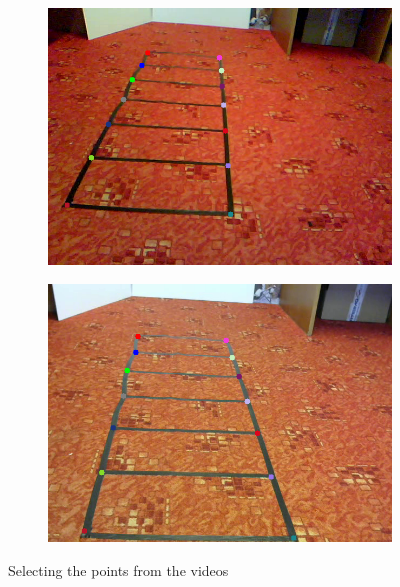 \begin{figure}
\centering
\begin{subfigure}{0.48\linewidth}
	\includegraphics[width=\linewidth]{img/experiments/left-ladder.png}
\end{subfigure}
\begin{subfigure}{0.48\linewidth}
	\includegraphics[width=\linewidth]{img/experiments/right-ladder.png}
\end{subfigure}
\caption{Selecting the points from the videos}
\label{fig:ladder_ground}
\end{figure}



